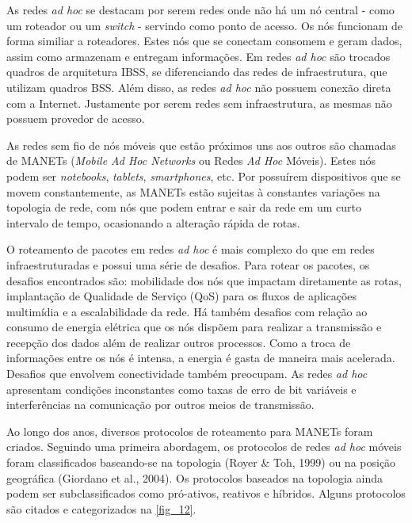 \documentclass[
12pt,				%
openright,			%
oneside,			%
a4paper,			%
brazil,				%
]{abntex2}
\begin{document}
	\par As redes \textit{ad hoc} se destacam por serem redes onde não há um nó central - como um roteador ou um \textit{switch} - servindo como ponto de acesso. Os nós funcionam de forma similiar a roteadores. Estes nós que se conectam consomem e geram dados, assim como armazenam e entregam informações. Em redes \textit{ad hoc} são trocados quadros de arquitetura IBSS, se diferenciando das redes de infraestrutura, que utilizam quadros BSS. Além disso, as redes \textit{ad hoc} não possuem conexão direta com a Internet. Justamente por serem redes sem infraestrutura, as mesmas não possuem provedor de acesso.
	
	\par As redes sem fio de nós móveis que estão próximos uns aos outros são chamadas de MANETs (\textit{Mobile Ad Hoc Networks} ou Redes \textit{Ad Hoc} Móveis). Estes nós podem ser \textit{notebooks}, \textit{tablets}, \textit{smartphones}, etc. Por possuírem dispositivos que se movem constantemente, as MANETs estão sujeitas à constantes variações na topologia de rede, com nós que podem entrar e sair da rede em um curto intervalo de tempo, ocasionando a alteração rápida de rotas. 
	
	\par O roteamento de pacotes em redes \textit{ad hoc} é mais complexo do que em redes infraestruturadas e possui uma série de desafios. Para rotear os pacotes, os desafios encontrados são: mobilidade dos nós que impactam diretamente as rotas, implantação de Qualidade de Serviço (QoS) para os fluxos de aplicações multimídia e a escalabilidade da rede. Há também desafios com relação ao consumo de energia elétrica que os nós dispõem para realizar a transmissão e recepção dos dados além de realizar outros processos. Como a troca de informações entre os nós é intensa, a energia é gasta de maneira mais acelerada. Desafios que envolvem conectividade também preocupam. As redes \textit{ad hoc} apresentam condições inconstantes como taxas de erro de bit variáveis e interferências na comunicação por outros meios de transmissão.
	
	\par Ao longo dos anos, diversos protocolos de roteamento para MANETs foram criados. Seguindo uma primeira abordagem, os protocolos de redes \textit{ad hoc} móveis foram classificados baseando-se na topologia (Royer \& Toh, 1999) ou na posição geográfica (Giordano et al., 2004). Os protocolos baseados na topologia ainda podem ser subclassificados como pró-ativos, reativos e híbridos. Alguns protocolos são citados e categorizados na \autoref{fig_12}.
	
\end{document}
